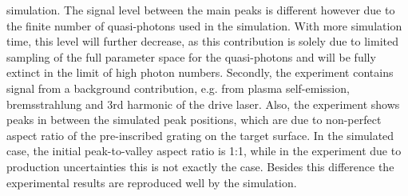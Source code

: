\documentclass[10pt]{scrartcl}
\begin{document}
simulation.  The signal level between the main peaks is different however due to
the finite number of quasi-photons used in the simulation.  With more simulation
time, this level will further decrease, as this contribution is solely due to
limited sampling of the full parameter space for the quasi-photons and will be
fully extinct in the limit of high photon numbers.  Secondly, the experiment
contains signal from a background contribution, e.g. from plasma self-emission,
bremsstrahlung and 3rd harmonic of the drive laser.  Also, the experiment shows
peaks in between the simulated peak positions, which are due to non-perfect
aspect ratio of the pre-inscribed grating on the target surface.  In the
simulated case, the initial peak-to-valley aspect ratio is 1:1, while in the
experiment due to production uncertainties this is not exactly the case.
Besides this difference the experimental results are reproduced well by the
simulation.

%
\end{document}
